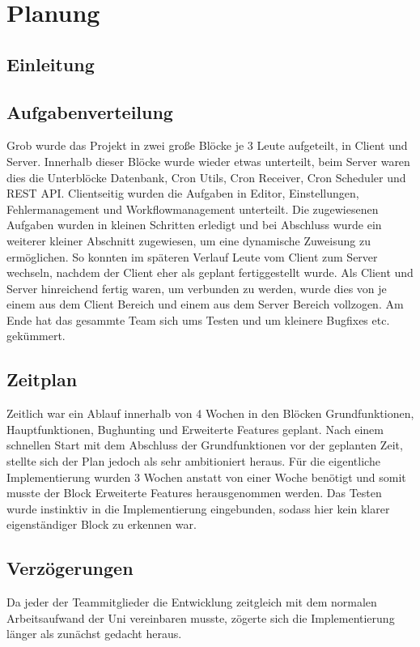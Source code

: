 \chapter{Planung}
    
    \section{Einleitung}
    
    \section{Aufgabenverteilung}
    Grob wurde das Projekt in zwei große Blöcke je 3 Leute aufgeteilt, in Client und Server. Innerhalb dieser Blöcke wurde wieder etwas unterteilt, beim Server waren dies die Unterblöcke Datenbank, Cron Utils, Cron Receiver, Cron Scheduler und REST API. Clientseitig wurden die Aufgaben in Editor, Einstellungen, Fehlermanagement und Workflowmanagement unterteilt. Die zugewiesenen Aufgaben wurden in kleinen Schritten erledigt und bei Abschluss wurde ein weiterer kleiner Abschnitt zugewiesen, um eine dynamische Zuweisung zu ermöglichen. So konnten im späteren Verlauf Leute vom Client zum Server wechseln, nachdem der Client eher als geplant fertiggestellt wurde. Als Client und Server hinreichend fertig waren, um verbunden zu werden, wurde dies von je einem aus dem Client Bereich und einem aus dem Server Bereich vollzogen. Am Ende hat das gesammte Team sich ums Testen und um kleinere Bugfixes etc. gekümmert. 
    
    \section{Zeitplan}
    Zeitlich war ein Ablauf innerhalb von 4 Wochen in den Blöcken Grundfunktionen, Hauptfunktionen, Bughunting und Erweiterte Features geplant. Nach einem schnellen Start mit dem Abschluss der Grundfunktionen vor der geplanten Zeit, stellte sich der Plan jedoch als sehr ambitioniert heraus. Für die eigentliche Implementierung wurden 3 Wochen anstatt von einer Woche benötigt und somit musste der Block Erweiterte Features herausgenommen werden. Das Testen wurde instinktiv in die Implementierung eingebunden, sodass hier kein klarer eigenständiger Block zu erkennen war. 
    
    \section{Verzögerungen}
    Da jeder der Teammitglieder die Entwicklung zeitgleich mit dem normalen Arbeitsaufwand der Uni vereinbaren musste, zögerte sich die Implementierung länger als zunächst gedacht heraus.
    
